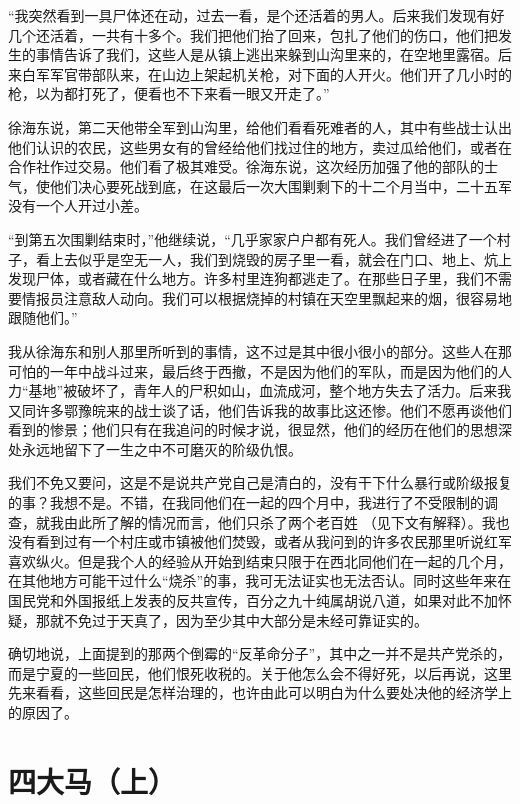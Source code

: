\documentclass[10pt]{book}
\begin{document}
“我突然看到一具尸体还在动，过去一看，是个还活着的男人。后来我们发现有好几个还活着，一共有十多个。我们把他们抬了回来，包扎了他们的伤口，他们把发生的事情告诉了我们，这些人是从镇上逃出来躲到山沟里来的，在空地里露宿。后来白军军官带部队来，在山边上架起机关枪，对下面的人开火。他们开了几小时的枪，以为都打死了，便看也不下来看一眼又开走了。”

徐海东说，第二天他带全军到山沟里，给他们看看死难者的人，其中有些战士认出他们认识的农民，这些男女有的曾经给他们找过住的地方，卖过瓜给他们，或者在合作社作过交易。他们看了极其难受。徐海东说，这次经历加强了他的部队的士气，使他们决心要死战到底，在这最后一次大围剿剩下的十二个月当中，二十五军没有一个人开过小差。

“到第五次围剿结束时，”他继续说，“几乎家家户户都有死人。我们曾经进了一个村子，看上去似乎是空无一人，我们到烧毁的房子里一看，就会在门口、地上、炕上发现尸体，或者藏在什么地方。许多村里连狗都逃走了。在那些日子里，我们不需要情报员注意敌人动向。我们可以根据烧掉的村镇在天空里飘起来的烟，很容易地跟随他们。”

我从徐海东和别人那里所听到的事情，这不过是其中很小很小的部分。这些人在那可怕的一年中战斗过来，最后终于西撤，不是因为他们的军队，而是因为他们的人力“基地”被破坏了，青年人的尸积如山，血流成河，整个地方失去了活力。后来我又同许多鄂豫皖来的战士谈了话，他们告诉我的故事比这还惨。他们不愿再谈他们看到的惨景；他们只有在我追问的时候才说，很显然，他们的经历在他们的思想深处永远地留下了一生之中不可磨灭的阶级仇恨。

我们不免又要问，这是不是说共产党自己是清白的，没有干下什么暴行或阶级报复的事？我想不是。不错，在我同他们在一起的四个月中，我进行了不受限制的调查，就我由此所了解的情况而言，他们只杀了两个老百姓 （见下文有解释）。我也没有看到过有一个村庄或市镇被他们焚毁，或者从我问到的许多农民那里听说红军喜欢纵火。但是我个人的经验从开始到结束只限于在西北同他们在一起的几个月，在其他地方可能干过什么“烧杀”的事，我可无法证实也无法否认。同时这些年来在国民党和外国报纸上发表的反共宣传，百分之九十纯属胡说八道，如果对此不加怀疑，那就不免过于天真了，因为至少其中大部分是未经可靠证实的。

确切地说，上面提到的那两个倒霉的“反革命分子”，其中之一并不是共产党杀的，而是宁夏的一些回民，他们恨死收税的。关于他怎么会不得好死，以后再说，这里先来看看，这些回民是怎样治理的，也许由此可以明白为什么要处决他的经济学上的原因了。

\section{四大马（上）}
\end{document}
